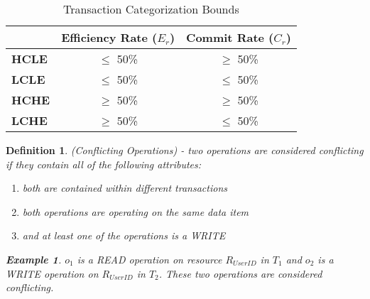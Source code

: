 \documentclass[conference]{IEEEtran}
\newtheorem{definition}{Definition}
\newtheorem{example}{Example}[definition]
\begin{document}
\begin{table}[h]
\captionsetup{justification=centering}
\centering
\begin{tabular}{l|c|c|}
\cline{2-3}
                                          & \multicolumn{1}{l|}{\textbf{Efficiency Rate ($E_{r}$)}} & \multicolumn{1}{l|}{\textbf{Commit Rate ($C_{r}$)}} \\ \hline
\multicolumn{1}{|l|}{\textbf{HCLE}}  & $\le$ 50\%                       & $\ge$ 50\%                               \\ \hline
\multicolumn{1}{|l|}{\textbf{LCLE}} & $\le$ 50\%                       & $\le$ 50\%                                 \\ \hline
\multicolumn{1}{|l|}{\textbf{HCHE}}  & $\ge$ 50\%                          & $\ge$ 50\%                                \\ \hline
\multicolumn{1}{|l|}{\textbf{LCHE}} & $\ge$ 50\%                          & $\le$ 50\%                                  \\ \hline
\end{tabular}
\caption{Transaction Categorization Bounds} %
\label{tbl:default_tmetrics} %
\end{table}

%  
%  

\begin{definition}
\label{conflict_ops}
 (Conflicting Operations) - two operations are considered conflicting if they contain all of the following attributes:

 \begin{enumerate}
   \item both are contained within different transactions
   \item both operations are operating on the same data item
   \item and at least one of the operations is a WRITE
 \end{enumerate}

 \begin{example}
 \label{ex_conflict_ops}
  $o_{1}$ is a READ operation on resource $R_{User ID}$ in $T_{1}$ and $o_{2}$ is a WRITE operation on $R_{User ID}$ in    $T_{2}$. These two operations are considered conflicting.
 \end{example}
\end{definition}
\end{document}
